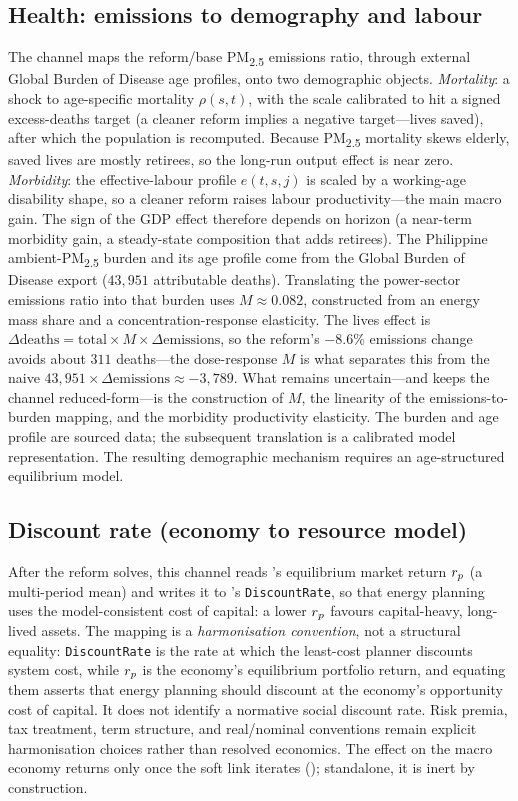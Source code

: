 \subsection{Health: emissions to demography and labour}\label{sec:ch-health}
The  channel maps the reform/base PM\textsubscript{2.5} emissions ratio,
through external Global Burden of Disease age profiles, onto two demographic objects.
\emph{Mortality}: a shock to age-specific mortality $\rho(s,t)$, with the scale calibrated
to hit a signed excess-deaths target (a cleaner reform implies a negative target---lives
saved), after which the population is recomputed. Because PM\textsubscript{2.5} mortality
skews elderly, saved lives are mostly retirees, so the long-run output effect is near
zero. \emph{Morbidity}: the effective-labour profile $e(t,s,j)$ is scaled by a
working-age disability shape, so a cleaner reform raises labour productivity---the main
macro gain. The sign of the GDP effect therefore depends on horizon (a near-term morbidity
gain, a steady-state composition that adds retirees). The Philippine
ambient-PM\textsubscript{2.5} burden and its age profile come from the Global Burden of
Disease export ($43{,}951$ attributable deaths). Translating the power-sector emissions
ratio into that burden uses $M\approx0.082$, constructed from an energy mass share and a
concentration-response elasticity. The lives effect is
$\Delta\text{deaths}=\text{total}\times M\times\Delta\text{emissions}$, so the reform's
$-8.6\%$ emissions change avoids about $311$ deaths---the
dose-response $M$ is what
separates this from the naive $43{,}951\times\Delta\text{emissions}\approx-3{,}789$. What
remains uncertain---and keeps the channel reduced-form---is the construction of $M$, the
linearity of the emissions-to-burden mapping, and the morbidity productivity elasticity.
The burden and age profile are sourced data; the subsequent translation is a calibrated
model representation. The resulting demographic mechanism requires an age-structured
equilibrium model.

\subsection{Discount rate (economy to resource model)}\label{sec:ch-discount}
After the reform solves, this channel reads \OGCore{}'s equilibrium market return $r_{p}$
(a multi-period mean) and writes it to \CLEWS{}'s \texttt{DiscountRate}, so that energy
planning uses the model-consistent cost of capital: a lower $r_{p}$ favours capital-heavy,
long-lived assets. The mapping is a \emph{harmonisation convention}, not a structural
equality: \texttt{DiscountRate} is the rate at which the least-cost planner discounts
system cost, while $r_{p}$ is the economy's equilibrium portfolio return, and equating
them asserts that energy planning should discount at the economy's opportunity cost of
capital. It does not identify a normative social discount rate. Risk premia, tax
treatment, term structure, and real/nominal conventions remain explicit harmonisation
choices rather than resolved economics. The effect on the macro
economy returns only once the soft link
iterates (); standalone, it is inert by construction.

